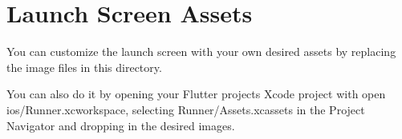 \chapter{Launch Screen Assets}
\hypertarget{md_ios_2_runner_2_assets_8xcassets_2_launch_image_8imageset_2_r_e_a_d_m_e}{}\label{md_ios_2_runner_2_assets_8xcassets_2_launch_image_8imageset_2_r_e_a_d_m_e}
\label{md_ios_2_runner_2_assets_8xcassets_2_launch_image_8imageset_2_r_e_a_d_m_e_autotoc_md0}%
%


You can customize the launch screen with your own desired assets by replacing the image files in this directory.

You can also do it by opening your Flutter project\textquotesingle{}s Xcode project with {\ttfamily open ios/\+Runner.\+xcworkspace}, selecting {\ttfamily Runner/\+Assets.\+xcassets} in the Project Navigator and dropping in the desired images. 